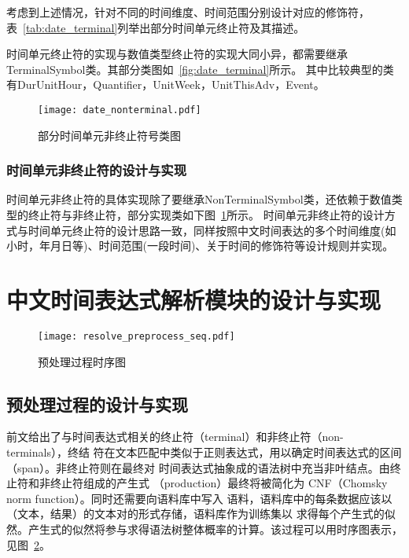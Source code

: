 考虑到上述情况，针对不同的时间维度、时间范围分别设计对应的修饰符，表~\ref{tab:date_terminal}列举出部分时间单元终止符及其描述。


时间单元终止符的实现与数值类型终止符的实现大同小异，都需要继承TerminalSymbol类。其部分类图如~\ref{fig:date_terminal}所示。
其中比较典型的类有DurUnitHour，Quantifier，UnitWeek，UnitThisAdv，Event。

\begin{figure}[h]
    \centering
    \texttt{[image: date\_nonterminal.pdf]}
    \caption{部分时间单元非终止符号类图}
    \label{fig:date_nonterminal}
\end{figure}

\subsubsection{时间单元非终止符的设计与实现}

时间单元非终止符的具体实现除了要继承NonTerminalSymbol类，还依赖于数值类型的终止符与非终止符，部分实现类如下图~\ref{fig:date_nonterminal}所示。
时间单元非终止符的设计方式与时间单元终止符的设计思路一致，同样按照中文时间表达的多个时间维度(如小时，年月日等)、时间范围(一段时间)、关于时间的修饰符等设计规则并实现。

\section{中文时间表达式解析模块的设计与实现}

\begin{figure}[h]
    \centering
    \texttt{[image: resolve\_preprocess\_seq.pdf]}
    \caption{预处理过程时序图}
    \label{fig:resolve_preprocess_seq}
\end{figure}

\subsection{预处理过程的设计与实现}

前文给出了与时间表达式相关的终止符（terminal）和非终止符（non-terminals），终结
符在文本匹配中类似于正则表达式，用以确定时间表达式的区间（span）。非终止符则在最终对
时间表达式抽象成的语法树中充当非叶结点。由终止符和非终止符组成的产生式
（production）最终将被简化为 CNF（Chomsky norm function）。同时还需要向语料库中写入
语料，语料库中的每条数据应该以（文本，结果）的文本对的形式存储，语料库作为训练集以
求得每个产生式的似然。产生式的似然将参与求得语法树整体概率的计算。该过程可以用时序图表示，见图~\ref{fig:resolve_preprocess_seq}。



